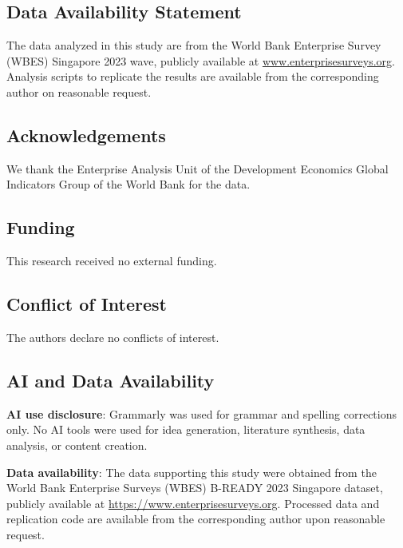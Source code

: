 \documentclass[
  12pt,a4paper]{article}
\begin{document}
\hypertarget{data-availability-statement}{%
\subsection{Data Availability
Statement}\label{data-availability-statement}}

The data analyzed in this study are from the World Bank Enterprise
Survey (WBES) Singapore 2023 wave, publicly available at
\href{http://www.enterprisesurveys.org}{www.enterprisesurveys.org}.
Analysis scripts to replicate the results are available from the
corresponding author on reasonable request.

\hypertarget{acknowledgements}{%
\subsection{Acknowledgements}\label{acknowledgements}}

We thank the Enterprise Analysis Unit of the Development Economics
Global Indicators Group of the World Bank for the data.

\hypertarget{funding}{%
\subsection{Funding}\label{funding}}

This research received no external funding.

\hypertarget{conflict-of-interest}{%
\subsection{Conflict of Interest}\label{conflict-of-interest}}

The authors declare no conflicts of interest.

\hypertarget{ai-and-data-availability}{%
\subsection{AI and Data Availability}\label{ai-and-data-availability}}

\textbf{AI use disclosure}: Grammarly was used for grammar and spelling
corrections only. No AI tools were used for idea generation, literature
synthesis, data analysis, or content creation.

\textbf{Data availability}: The data supporting this study were obtained
from the World Bank Enterprise Surveys (WBES) B-READY 2023 Singapore
dataset, publicly available at \url{https://www.enterprisesurveys.org}.
Processed data and replication code are available from the corresponding
author upon reasonable request.
\end{document}
